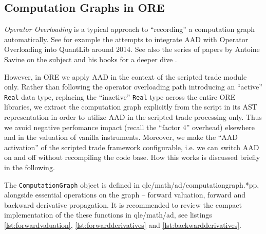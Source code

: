 \subsection{Computation Graphs in ORE}

{\em Operator Overloading} is a typical approach to ``recording'' a computation graph automatically.
See for example the attempts to integrate AAD with Operator Overloading into QuantLib \cite{QuantLib}
around 2014. See also the series of papers by Antoine Savine on the subject \cite{savine_cg_1,
  savine_cg_2, savine_cg_3} and his books for a deeper dive \cite{savine_book_1, savine_book_2}.

However, in ORE we apply AAD in the context of the scripted trade module only. Rather than following
the operator overloading path introducing an ``active'' {\tt Real} data type, replacing the
``inactive'' {\tt Real} type across the entire ORE libraries, we extract the computation graph
explicitly from the script in its AST representation in order to utilize AAD in the scripted trade
processing only. Thus we avoid negative perfomance impact (recall the ``factor 4'' overhead)
elsewhere and in the valuation of vanilla instruments. Moreover, we make the ``AAD activation'' of the
scripted trade framework configurable, i.e. we can switch AAD on and off without recompiling the
code base. How this works is discussed briefly in the following.

The {\tt ComputationGraph} object is defined in qle/math/ad/computationgraph.*pp, alongside
essential operations on the graph -- forward valuation, forward and backward derivative propagation.
It is recommended to review the compact implementation of the these functions in qle/math/ad,
see listings \ref{lst:forwardvaluation}, \ref{lst:forwardderivatives} and \ref{lst:backwardderivatives}.

